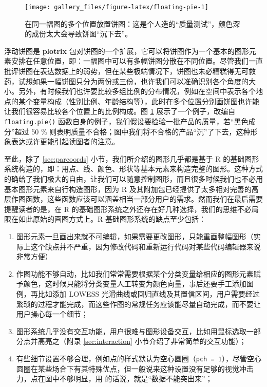 \documentclass[
  b5paper,
  UTF8,twoside]{book}
\begin{document}
\begin{figure}

{\centering \texttt{[image: gallery\_files/figure-latex/floating-pie-1]} 

}

\caption[在同一幅图的多个位置放置饼图]{在同一幅图的多个位置放置饼图：这是个人造的``质量测试''，颜色深的成份太大会导致饼图``沉下去''。}\label{fig:floating-pie}
\end{figure}

浮动饼图是 \textbf{plotrix} 包对饼图的一个扩展，它可以将饼图作为一个基本的图形元素安排在任意位置，即：一幅图中可以有多幅饼图分散在不同位置。尽管我们一直批评饼图在表达数据上的弱势，但在某些极端情况下，饼图也未必糟糕得无可救药，试想如果一幅饼图只分为两份或三份，也许我们可以准确识别各个角度的大小。另外，有时候我们也许要比较多组比例的分布情况，例如在空间中表示各个地点的某个变量构成（性别比例、年龄结构等），此时在多个位置分别画饼图也许能让我们很容易比较各个位置上的比例构成。图 \ref{fig:floating-pie}
展示了一个例子，改编自 \texttt{floating.pie()} 函数自身的例子，我们假设要检验一批产品的质量，若``黑色成分''超过 50 \% 则表明质量不合格；图中我们将不合格的产品``沉''了下去，这种形象表达或许更能引起读图者的注意。

至此，除了 \ref{sec:parcoords} 小节，我们所介绍的图形几乎都是基于 R 的基础图形系统构造的，即：用点、线、颜色、形状等基本元素来构造完整的图形。这种方式的确给了我们极大的自由，让我们可以随意控制图形，而且很多时候我们也不必用基本图形元素来自行构造图形，因为 R 及其附加包已经提供了太多相对完善的高层作图函数，这些函数应该可以涵盖相当一部分用户的需求。然而我们在最后需要提醒读者的是，在 R 的基础图形系统之外还存在好几种选择，我们的思维不必局限在如此原始的画图方式上。R 基础图形系统的缺点至少包括：

\begin{enumerate}
\def\labelenumi{\arabic{enumi}.}
\item
  图形元素一旦画出来就不可编辑，如果需要更改图形，只能重画整幅图形（实际上这个缺点并不严重，因为修改代码和重新运行代码对某些代码编辑器来说非常方便）
\item
  作图功能不够自动，比如我们常常需要根据某个分类变量给相应的图形元素赋予颜色，这时候只能将分类变量人工转变为颜色向量，事后还要手工添加图例，再比如添加 LOWESS 光滑曲线或回归直线及其置信区间，用户需要经过繁琐的过程才能完成，而这些作图的常规任务应该能尽量自动完成，而不要让用户操心每一个细节；
\item
  图形系统几乎没有交互功能，用户很难与图形设备交互，比如用鼠标选取一部分点并高亮之（附录 \ref{sec:interaction} 小节介绍了非常简单的交互功能）；
\item
  有些细节设置不够合理，例如点的样式默认为空心圆圈（\texttt{pch\ =\ 1}），尽管空心圆圈在某些场合下有其特殊优点，但一般说来这种设置没有足够的视觉冲击力，点在图中不够明显，用 \citet{Cleveland85} 的话说，就是``数据不能突出来''；
\end{enumerate}
\end{document}
